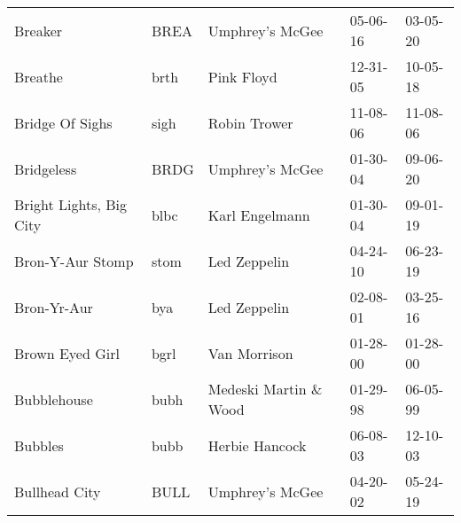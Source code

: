 \begin{longtable}{p{}p{}p{}p{}p{}}
                                                                 Breaker &          BREA &                                          Umphrey's McGee &              05-06-16 &             03-05-20 \\
                                                                 Breathe &          brth &                                               Pink Floyd &              12-31-05 &             10-05-18 \\
                                                         Bridge Of Sighs &          sigh &                                             Robin Trower &              11-08-06 &             11-08-06 \\
                                                              Bridgeless &          BRDG &                                          Umphrey's McGee &              01-30-04 &             09-06-20 \\
                                                 Bright Lights, Big City &          blbc &                                           Karl Engelmann &              01-30-04 &             09-01-19 \\
                                                        Bron-Y-Aur Stomp &          stom &                                             Led Zeppelin &              04-24-10 &             06-23-19 \\
                                                             Bron-Yr-Aur &           bya &                                             Led Zeppelin &              02-08-01 &             03-25-16 \\
                                                         Brown Eyed Girl &          bgrl &                                             Van Morrison &              01-28-00 &             01-28-00 \\
                                                             Bubblehouse &          bubh &                                   Medeski Martin \& Wood &              01-29-98 &             06-05-99 \\
                                                                 Bubbles &          bubb &                                           Herbie Hancock &              06-08-03 &             12-10-03 \\
                                                           Bullhead City &          BULL &                                          Umphrey's McGee &              04-20-02 &             05-24-19 \\

\end{longtable}
